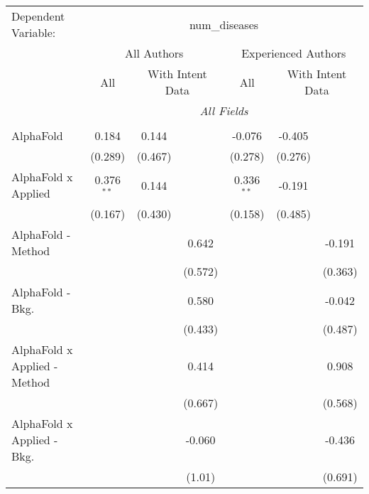 \begingroup
\centering
\begin{tabular}{lcccccc}
   \tabularnewline \midrule \midrule
   Dependent Variable: & \multicolumn{6}{c}{num\_diseases}\\
 & \multicolumn{3}{c}{All Authors} & \multicolumn{3}{c}{Experienced Authors} \\
\cmidrule(lr){2-4} \cmidrule(lr){5-7}
 & \multicolumn{1}{c}{All} & \multicolumn{2}{c}{With Intent Data} & \multicolumn{1}{c}{All} & \multicolumn{2}{c}{With Intent Data} \\
\cmidrule(lr){2-2} \cmidrule(lr){3-4} \cmidrule(lr){5-5} \cmidrule(lr){6-7}
 & \multicolumn{6}{c}{\textit{All Fields}} \\ \\
   AlphaFold                      & 0.184         & 0.144         &              & -0.076        & -0.405        &   \\   
                                  & (0.289)       & (0.467)       &              & (0.278)       & (0.276)       &   \\   
   AlphaFold x Applied            & 0.376$^{**}$  & 0.144         &              & 0.336$^{**}$  & -0.191        &   \\   
                                  & (0.167)       & (0.430)       &              & (0.158)       & (0.485)       &   \\   
   AlphaFold - Method             &               &               & 0.642        &               &               & -0.191\\   
                                  &               &               & (0.572)      &               &               & (0.363)\\   
   AlphaFold - Bkg.               &               &               & 0.580        &               &               & -0.042\\   
                                  &               &               & (0.433)      &               &               & (0.487)\\   
   AlphaFold x Applied - Method   &               &               & 0.414        &               &               & 0.908\\   
                                  &               &               & (0.667)      &               &               & (0.568)\\   
   AlphaFold x Applied - Bkg.     &               &               & -0.060       &               &               & -0.436\\   
                                  &               &               & (1.01)       &               &               & (0.691)\\   

\end{tabular}
